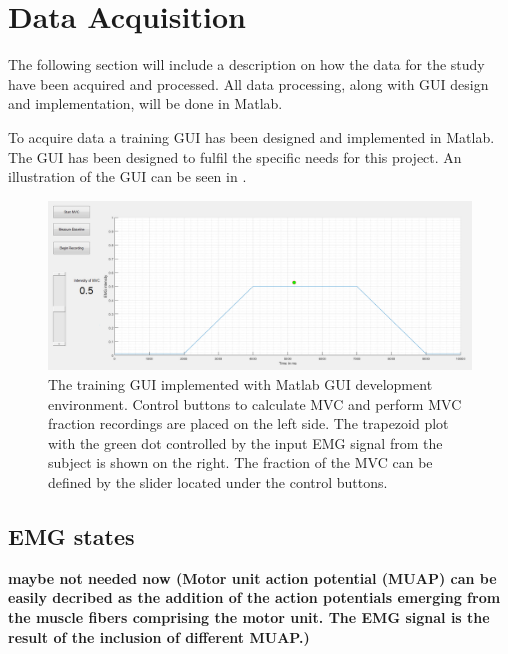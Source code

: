 \section{Data Acquisition}

The following section will include a description on how the data for the study have been acquired and processed. All data processing, along with GUI design and implementation, will be done in Matlab.

To acquire data a training GUI has been designed and implemented in Matlab. The GUI has been designed to fulfil the specific needs for this project. An illustration of the GUI can be seen in . 

\begin{figure}[H]
	\includegraphics[width=.9\textwidth]{figures/GUI/GUI_Training.png}
	\caption{The training GUI implemented with Matlab GUI development environment. Control buttons to calculate MVC and perform MVC fraction recordings are placed on the left side. The trapezoid plot with the green dot controlled by the input EMG signal from the subject is shown on the right. The fraction of the MVC can be defined by the slider located under the control buttons.}
	\label{fig:GUI_Training}
\end{figure} 


\subsection{EMG states}
\textbf{maybe not needed now (Motor unit action potential (MUAP) can be easily decribed as the addition of the action potentials emerging from the muscle fibers comprising the motor unit. The EMG signal is the result of the inclusion of different MUAP.)}

